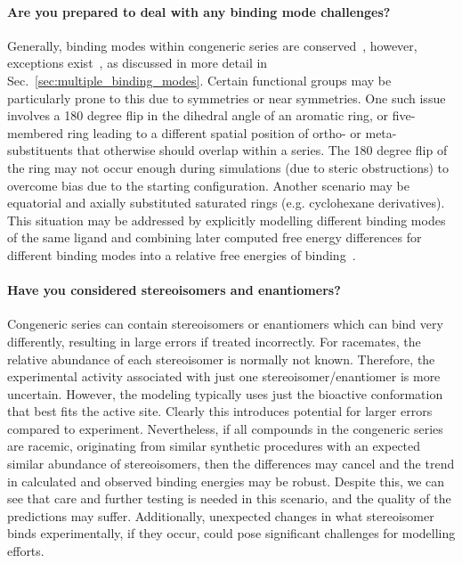 \documentclass[9pt,bestpractices,pubversion]{livecoms}
\begin{document}
\paragraph{Are you prepared to deal with any binding mode challenges?}
Generally, binding modes within congeneric series are conserved~\cite{wacker2010conserved}, however, exceptions exist~\cite{brandt2011congeneric,nazare2005probing}, as discussed in more detail in Sec.~\ref{sec:multiple_binding_modes}. Certain functional groups may be particularly prone to this due to symmetries or near symmetries. One such issue involves a 180 degree flip in the dihedral angle of an aromatic ring, or five-membered ring leading to a different spatial position of ortho- or meta- substituents that otherwise should overlap within a series. The 180 degree flip of the ring may not occur enough during simulations (due to steric obstructions) to overcome bias due to the starting configuration. Another scenario may be equatorial and axially substituted saturated rings (e.g. cyclohexane derivatives). This situation may be addressed by explicitly modelling different binding modes of the same ligand and combining later computed free energy differences for different binding modes into a relative free energies of binding~\cite{kaus2015how}.

\paragraph{Have you considered stereoisomers and enantiomers?}
Congeneric series can contain stereoisomers or enantiomers which can bind very differently, resulting in large errors if treated incorrectly. For racemates, the relative abundance of each stereoisomer is normally not known. Therefore, the experimental activity associated with just one stereoisomer/enantiomer is more uncertain. However, the modeling typically uses just the bioactive conformation that best fits the active site. Clearly this introduces potential for larger errors compared to experiment. Nevertheless, if all compounds in the congeneric series are racemic, originating from similar synthetic procedures with an expected similar abundance of stereoisomers, then the differences may cancel and the trend in calculated and observed binding energies may be robust. Despite this, we can see that care and further testing is needed in this scenario, and the quality of the predictions may suffer. Additionally, unexpected changes in what stereoisomer binds experimentally, if they occur, could pose significant challenges for modelling efforts.
\end{document}
